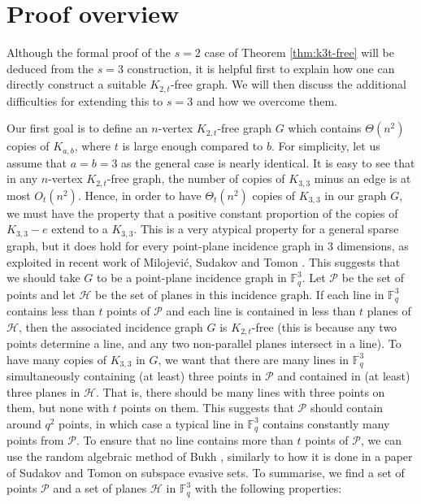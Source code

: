\documentclass[12pt]{article}
\begin{document}
\section{Proof overview} \label{sec:overview}

Although the formal proof of the $s=2$ case of Theorem \ref{thm:k3t-free} will be deduced from the $s=3$ construction, it is helpful first to explain how one can directly construct a suitable $K_{2,t}$-free graph. We will then discuss the additional difficulties for extending this to $s=3$ and how we overcome them.

Our first goal is to define an $n$-vertex $K_{2,t}$-free graph $G$ which contains $\Theta(n^2)$ copies of $K_{a,b}$, where $t$ is large enough compared to $b$. For simplicity, let us assume that $a=b=3$ as the general case is nearly identical. It is easy to see that in any $n$-vertex $K_{2,t}$-free graph, the number of copies of $K_{3,3}$ minus an edge is at most $O_t(n^2)$. Hence, in order to have $\Theta_t(n^2)$ copies of $K_{3,3}$ in our graph $G$, we must have the property that a positive constant proportion of the copies of $K_{3,3}-e$ extend to a $K_{3,3}$. This is a very atypical property for a general sparse graph, but it does hold for every point-plane incidence graph in $3$ dimensions, as exploited in recent work of Milojevi\'c, Sudakov and Tomon \cite{milojevic2024incidence}. This suggests that we should take $G$ to be a point-plane incidence graph in $\mathbb{F}_q^3$. Let $\mathcal{P}$ be the set of points and let $\mathcal{H}$ be the set of planes in this incidence graph. If each line in $\mathbb{F}_q^3$ contains less than $t$ points of $\mathcal{P}$ and each line is contained in less than $t$ planes of $\mathcal{H}$, then the associated incidence graph $G$ is $K_{2,t}$-free (this is because any two points determine a line, and any two non-parallel planes intersect in a line). To have many copies of $K_{3,3}$ in $G$, we want that there are many lines in $\mathbb{F}_q^3$ simultaneously containing (at least) three points in $\mathcal{P}$ and contained in (at least) three planes in $\mathcal{H}$. That is, there should be many lines with three points on them, but none with $t$ points on them. This suggests that $\mathcal{P}$ should contain around $q^2$ points, in which case a typical line in $\mathbb{F}_q^3$ contains constantly many points from $\mathcal{P}$. To ensure that no line contains more than $t$ points of $\mathcal{P}$, we can use the random algebraic method of Bukh \cite{bukh2015random}, similarly to how it is done in a paper of Sudakov and Tomon \cite{SudakovTomon} on subspace evasive sets. To summarise, we find a set of points $\mathcal{P}$ and a set of planes $\mathcal{H}$ in $\mathbb{F}_q^3$ with the following properties:
\end{document}
